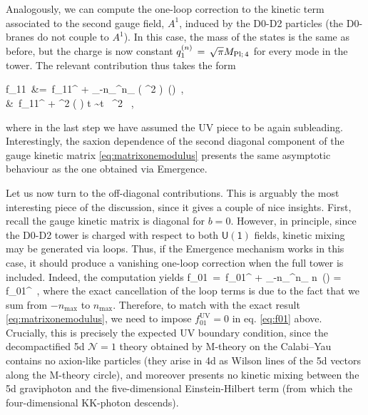 Analogously, we can compute the one-loop correction to the kinetic term associated to the second gauge field, $A^1$, induced by the D0-D2 particles (the D0-branes do not couple to $A^1$). In this case, the mass of the states is the same as before, but the charge is now constant $q_1^{(n)}\, =\,  \sqrt{\pi} M_{\text{Pl;}\, 4}$ for every mode in the tower. The relevant contribution thus takes the form
%
\beq \label{eq:f11} 
		\begin{aligned} f_{11}\, &=\, f_{11}^{} +  \sum_{-n_{}}^{n_{}}  \left( \pi \Mpf^2 \right)\ \log \left(\right)\, , \\ &\simeq\, f_{11}^{} + \beta \Mpf^2 \left( \right) t \sim   t \, \Mpf^2 \, ,
		\end{aligned}
\eeq
%
where in the last step we have assumed the UV piece to be again subleading. Interestingly, the saxion dependence of the second diagonal component of the gauge kinetic matrix   \eqref{eq:matrixonemodulus} presents the same asymptotic behaviour as the one obtained via Emergence.
		
Let us now turn to the off-diagonal contributions. This is arguably the most interesting piece of the discussion, since it gives a couple of nice insights. First, recall the gauge kinetic matrix is diagonal for $b=0$. However, in principle, since the D0-D2 tower is charged with respect to both $\mathsf{U(1)}$ fields, kinetic mixing may be generated via loops. Thus, if the Emergence mechanism works in this case, it should produce a vanishing one-loop correction when the full tower is included. Indeed, the computation yields
%
\beq \label{eq:f01}
		f_{01}\, =\, f_{01}^{} +  \sum_{-n_{}}^{n_{}}    n\ \log \left(\right) = f_{01}^{}\,  ,
\eeq
%
where the exact cancellation of the loop terms is due to the fact that we sum from $-n_{\text{max}}$ to $n_{\text{max}}$. %
Therefore, to match with the exact result \eqref{eq:matrixonemodulus}, we need to impose $f_{01}^{\text{UV}}=0$ in eq. \eqref{eq:f01} above. Crucially, this is precisely the expected UV boundary condition, since the decompactified 5d $\mathcal{N}=1$ theory obtained by M-theory on the Calabi--Yau contains no axion-like particles (they arise in 4d as Wilson lines of the 5d vectors along the M-theory circle), and moreover presents no kinetic mixing between the 5d graviphoton and the five-dimensional Einstein-Hilbert term (from which the four-dimensional KK-photon descends).  
		
